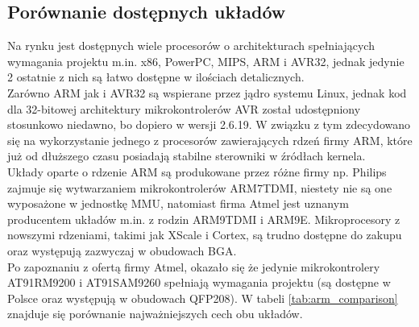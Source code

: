 \documentclass[a4paper,12pt]{book}
\begin{document}
			\subsection{Porównanie dostępnych układów}
				Na rynku jest dostępnych wiele procesorów o architekturach spełniających wymagania projektu m.in. x86, PowerPC, MIPS, ARM i AVR32, jednak jedynie 2 ostatnie z nich są łatwo dostępne w ilościach detalicznych.\\
				Zarówno ARM jak i AVR32 są wspierane przez jądro systemu Linux, jednak kod dla 32-bitowej architektury mikrokontrolerów AVR został udostępniony stosunkowo niedawno, bo dopiero w wersji 2.6.19. W związku z tym zdecydowano się na wykorzystanie jednego z procesorów zawierających rdzeń firmy ARM\cite{arm}, które już od dłuższego czasu posiadają stabilne sterowniki w źródłach kernela.\\
				Układy oparte o rdzenie ARM są produkowane przez różne firmy np. Philips zajmuje się wytwarzaniem mikrokontrolerów ARM7TDMI, niestety nie są one wyposażone w jednostkę MMU, natomiast firma Atmel jest uznanym producentem układów m.in. z rodzin ARM9TDMI i ARM9E. Mikroprocesory z nowszymi rdzeniami, takimi jak XScale i Cortex, są trudno dostępne do zakupu oraz występują zazwyczaj w obudowach BGA.\\
				Po zapoznaniu z ofertą firmy Atmel, okazało się że jedynie mikrokontrolery AT91RM9200 i AT91SAM9260 spełniają wymagania projektu (są dostępne w Polsce oraz występują w obudowach QFP208). W tabeli \ref{tab:arm_comparison} znajduje się porównanie najważniejszych cech obu układów.
				
\end{document}
